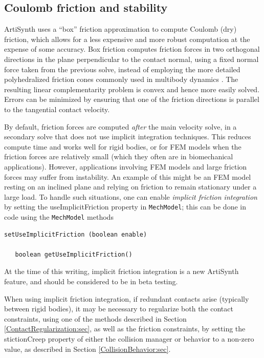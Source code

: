 \subsection{Coulomb friction and stability}
\label{FrictionAndStability:sec}

ArtiSynth uses a ``box'' friction approximation
\cite{Lacoursiere07} to compute Coulomb (dry) friction,
which allows for a less expensive and more robust computation at the
expense of some accuracy. Box friction computes friction forces in two
orthogonal directions in the plane perpendicular to the contact
normal, using a fixed normal force taken from the previous solve,
instead of employing the more detailed polyhedralized friction cones
commonly used in multibody dynamics
\cite{AnitescuPotra2002,PotraEtAlTrapezoidal2006}. 
The resulting linear complementarity problem is convex and hence more
easily solved. Errors can be minimized by ensuring that one of the
friction directions is parallel to the tangential contact velocity.

By default, friction forces are computed {\it after} the main
velocity solve, in a secondary solve that does not use implicit
integration techniques. This reduces compute time and works well for
rigid bodies, or for FEM models when the friction forces are
relatively small (which they often are in biomechanical applications).
However, applications involving FEM models and large friction forces
may suffer from instability. An example of this might be an FEM model
resting on an inclined plane and relying on friction to remain
stationary under a large load. To handle such situations, one can
enable {\it implicit friction integration} by setting the {\sf
useImplicitFriction} property in {\tt MechModel}; this can be done in
code using the {\tt MechModel} methods
%
\begin{lstlisting}[]
   setUseImplicitFriction (boolean enable)

   boolean getUseImplicitFriction()
\end{lstlisting}
%

\begin{sideblock}
At the time of this writing, implicit friction integration is a new
ArtiSynth feature, and should be considered to be in beta testing.

When using implicit friction integration, if redundant contacts arise
(typically between rigid bodies), it may be necessary to regularize
both the contact constraints, using one of the methods described in
Section \ref{ContactRegularization:sec}, as well as the friction
constraints, by setting the {\sf stictionCreep} property of either the
collision manager or behavior to a non-zero value, as described in
Section \ref{CollisionBehavior:sec}.
\end{sideblock}

